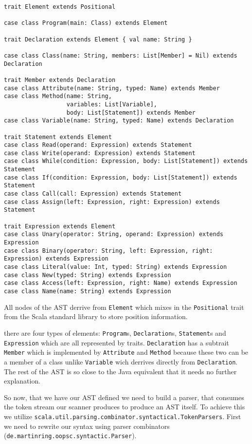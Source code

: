 \documentclass{style}
\begin{document}
\begin{lstlisting}[name=syntax]
trait Element extends Positional
  
case class Program(main: Class) extends Element
  
trait Declaration extends Element { val name: String }
  
case class Class(name: String, members: List[Member] = Nil) extends Declaration  

trait Member extends Declaration
case class Attribute(name: String, typed: Name) extends Member
case class Method(name: String, 
                  variables: List[Variable], 
                  body: List[Statement]) extends Member
case class Variable(name: String, typed: Name) extends Declaration
  
trait Statement extends Element
case class Read(operand: Expression) extends Statement
case class Write(operand: Expression) extends Statement
case class While(condition: Expression, body: List[Statement]) extends Statement
case class If(condition: Expression, body: List[Statement]) extends Statement
case class Call(call: Expression) extends Statement
case class Assign(left: Expression, right: Expression) extends Statement

trait Expression extends Element
case class Unary(operator: String, operand: Expression) extends Expression
case class Binary(operator: String, left: Expression, right: Expression) extends Expression
case class Literal(value: Int, typed: String) extends Expression
case class New(typed: String) extends Expression
case class Access(left: Expression, right: Name) extends Expression
case class Name(name: String) extends Expression    
\end{lstlisting}

All nodes of the AST derrive from \texttt{Element} which mixes in the \texttt{Positional} trait from the Scala standard library to store position information.

there are four types of elements: \texttt{Program}s, \texttt{Declaration}s, \texttt{Statement}s and \texttt{Expression} which are all represented by traits. \texttt{Declaration} has a subtrait \texttt{Member} which is implemented by \texttt{Attribute} and \texttt{Method} because these two can be a member of a class unlike \texttt{Variable} wich derrives directly from \texttt{Declaration}. The rest of the AST is so close to the Java equivalent that it needs no further explanation.

So now, that we have our AST defined we need to build a parser, that consumes the token stream our scanner produces to produce an AST itself. To achieve this we utilize \texttt{scala.util.parsing.combinator.syntactical.TokenParsers}. First we need to rewrite our syntax using parser combinators (\texttt{de.martinring.oopsc.syntactic.Parser}).
\end{document}
